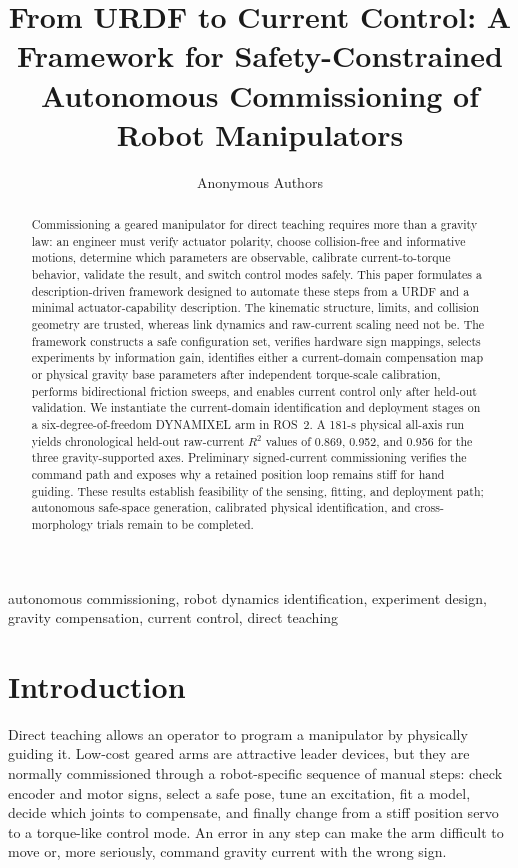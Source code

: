 \documentclass[conference]{IEEEtran}
\title{From URDF to Current Control: A Framework for Safety-Constrained Autonomous Commissioning of Robot Manipulators}
\author{Anonymous Authors}
\begin{document}
\maketitle

\begin{abstract}
Commissioning a geared manipulator for direct teaching requires more than a
gravity law: an engineer must verify actuator polarity, choose collision-free
and informative motions, determine which parameters are observable, calibrate
current-to-torque behavior, validate the result, and switch control modes
safely. This paper formulates a description-driven framework designed to automate
these steps from a URDF and a minimal actuator-capability description. The
kinematic structure, limits, and collision geometry are trusted, whereas link
dynamics and raw-current scaling need not be. The framework constructs a safe
configuration set, verifies hardware sign mappings, selects experiments by
information gain, identifies either a current-domain compensation map or
physical gravity base parameters after independent torque-scale calibration,
performs bidirectional friction sweeps, and enables current control only after
held-out validation. We instantiate the current-domain identification and
deployment stages on a six-degree-of-freedom DYNAMIXEL arm in ROS~2. A 181-s
physical all-axis run yields chronological held-out raw-current $R^2$ values of
0.869, 0.952, and 0.956 for the three gravity-supported axes. Preliminary
signed-current commissioning verifies the command path and exposes why a
retained position loop remains stiff for hand guiding. These results establish
feasibility of the sensing, fitting, and deployment path; autonomous safe-space
generation, calibrated physical identification, and cross-morphology trials
remain to be completed.
\end{abstract}

\begin{IEEEkeywords}
autonomous commissioning, robot dynamics identification, experiment design,
gravity compensation, current control, direct teaching
\end{IEEEkeywords}

\section{Introduction}
Direct teaching allows an operator to program a manipulator by physically
guiding it. Low-cost geared arms are attractive leader devices, but they are
normally commissioned through a robot-specific sequence of manual steps:
check encoder and motor signs, select a safe pose, tune an excitation, fit a
model, decide which joints to compensate, and finally change from a stiff
position servo to a torque-like control mode. An error in any step can make the
arm difficult to move or, more seriously, command gravity current with the
wrong sign.
\end{document}
